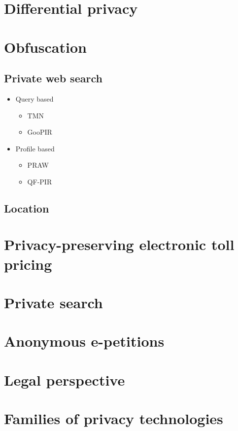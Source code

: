 \documentclass[a4paper,12pt,dutch]{article}
\begin{document}
\section{Differential privacy}

\section{Obfuscation}
\subsection{Private web search}
\begin{itemize}
	\item Query based
	\begin{itemize}
		\item TMN
		\item GooPIR
	\end{itemize}
	\item Profile based
	\begin{itemize}
		\item PRAW
		\item QF-PIR
	\end{itemize}
\end{itemize}
\subsection{Location}

\section{Privacy-preserving electronic toll pricing}

\section{Private search}

\section{Anonymous e-petitions}

\section{Legal perspective}

\section{Families of privacy technologies}
\end{document}
